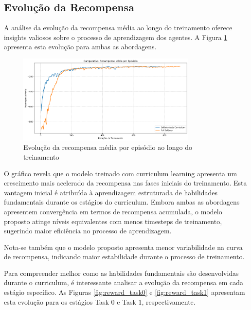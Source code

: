 \subsection{Evolução da Recompensa}

A análise da evolução da recompensa média ao longo do treinamento oferece insights valiosos sobre o processo de aprendizagem dos agentes. A Figura \ref{fig:episode_reward} apresenta esta evolução para ambas as abordagens.

\begin{figure}[H]
    \centering
    \includegraphics[width=0.8\textwidth]{fig/graficos_trabalho/graficos_experimentos/geral/comparativo_recompensa_media.png}
    \caption{Evolução da recompensa média por episódio ao longo do treinamento}
    \label{fig:episode_reward}
\end{figure}

O gráfico revela que o modelo treinado com curriculum learning apresenta um crescimento mais acelerado da recompensa nas fases iniciais do treinamento. Esta vantagem inicial é atribuída à aprendizagem estruturada de habilidades fundamentais durante os estágios do curriculum. Embora ambas as abordagens apresentem convergência em termos de recompensa acumulada, o modelo proposto atinge níveis equivalentes com menos timesteps de treinamento, sugerindo maior eficiência no processo de aprendizagem.

Nota-se também que o modelo proposto apresenta menor variabilidade na curva de recompensa, indicando maior estabilidade durante o processo de treinamento.

Para compreender melhor como as habilidades fundamentais são desenvolvidas durante o curriculum, é interessante analisar a evolução da recompensa em cada estágio específico. As Figuras \ref{fig:reward_task0} e \ref{fig:reward_task1} apresentam esta evolução para os estágios Task 0 e Task 1, respectivamente.

